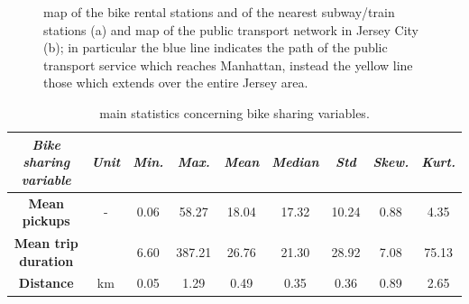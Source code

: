 \begin{figure}
	\centering
	\quad
	\quad
	\caption[]{map of the bike rental stations and of the nearest subway/train stations (a) and map of the public transport network in Jersey City (b); in particular the blue line indicates the path of the public transport service which reaches Manhattan, instead the yellow line those which extends over the entire Jersey area.}
	\label{Maps}
\end{figure}
 
\begin{table}
	\centering
	\renewcommand\arraystretch{1.3}
	\begin{tabular}{c|c|c|c|c|c|c|c|c}
		\hline
		\textit{Bike sharing variable} & \textit{Unit} & \textit{Min.} & \textit{Max.} & \textit{Mean} & \textit{Median} & \textit{Std} & \textit{Skew.}  & \textit{Kurt.}\\
		\hline
		\textbf{Mean pickups} & - & 0.06 & 58.27 & 18.04 & 17.32 & 10.24 & 0.88 & 4.35  \\
		\hline
		\textbf{Mean trip duration} & \si{\min} & 6.60 & 387.21 & 26.76 & 21.30 & 28.92 & 7.08 & 75.13  \\
		\hline
		\textbf{Distance} & \si{\kilo\meter} & 0.05 & 1.29 & 0.49 & 0.35 & 0.36 & 0.89 & 2.65  \\
		\hline
	\end{tabular}
	\caption[Main statistics concerning bike sharing variables]{main statistics concerning bike sharing variables.}
	\label{Bike_sharing_stats}
\end{table}

